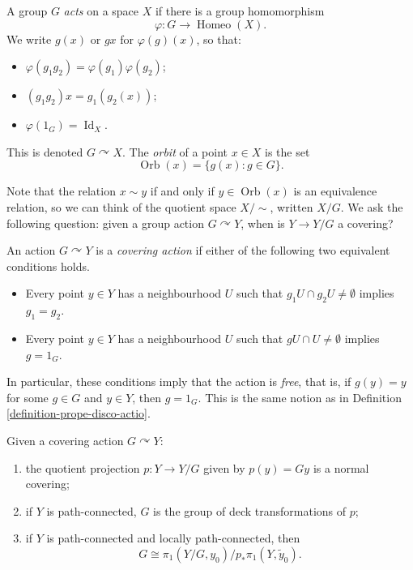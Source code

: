 \begin{definition}
\label{definition-group-action-space}
A group $G$ {\it acts} on a space $X$ if
there is a group homomorphism
$$
\varphi:G\to\operatorname{Homeo}(X).
$$
We write $g(x)$ or $gx$ for
$\varphi(g)(x)$, so that:
\begin{itemize}
\item
$\varphi(g_1g_2)=\varphi(g_1)\varphi(g_2)$;
\item $(g_1g_2)x=g_1(g_2(x))$;
\item
$\varphi(1_G)=\operatorname{Id}_X$.
\end{itemize}
This is denoted $G\curvearrowright X$. The
{\it orbit} of a point $x\in X$ is the set
$$
\operatorname{Orb}(x)=\{g(x):g\in G\}.
$$
\end{definition}

Note that the relation $x\sim y$ if and only
if $y\in\operatorname{Orb}(x)$ is an
equivalence relation, so we can think of the
quotient space $X/{\sim}$, written $X/G$. We
ask the following question: given a group
action $G\curvearrowright Y$, when is
$Y\to Y/G$ a covering?

\begin{definition}
\label{definition-covering-action}
An action $G\curvearrowright Y$ is a
{\it covering action} if either of the
following two equivalent conditions holds.
\begin{itemize}
\item Every point $y\in Y$ has a
neighbourhood $U$ such that
$g_1U\cap g_2U\neq\emptyset$ implies
$g_1=g_2$.
\item Every point $y\in Y$ has a
neighbourhood $U$ such that
$gU\cap U\neq\emptyset$ implies $g=1_G$.
\end{itemize}
In particular, these conditions imply that
the action is {\it free}, that is, if
$g(y)=y$ for some $g\in G$ and $y\in Y$,
then $g=1_G$. This is the same notion as in
Definition
\ref{definition-prope-disco-actio}.
\end{definition}

\begin{proposition}
\label{proposition-covering-action-quotient}
Given a covering action
$G\curvearrowright Y$:
\begin{enumerate}
\item the quotient projection
$p:Y\to Y/G$ given by $p(y)=Gy$ is a normal
covering;
\item if $Y$ is path-connected, $G$ is the
group of deck transformations of $p$;
\item if $Y$ is path-connected and locally
path-connected, then
$$
G\cong\pi_1(Y/G,y_0)\big/
p_*\pi_1(Y,\tilde{y}_0).
$$
\end{enumerate}
\end{proposition}

